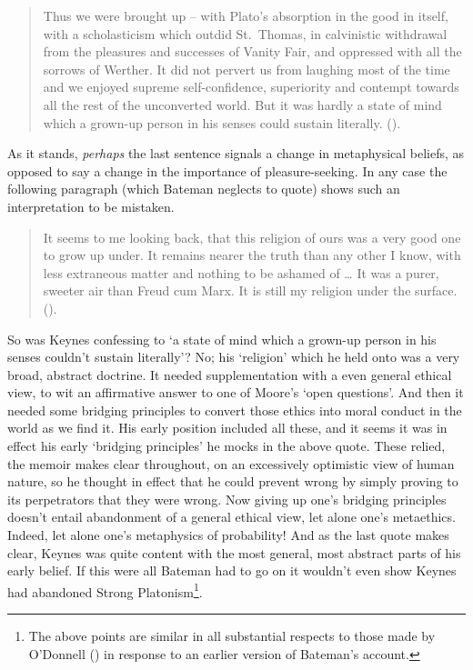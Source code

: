 \documentclass[
  10pt,
  letterpaper,
  DIV=11,
  numbers=noendperiod,
  twoside]{scrartcl}
\begin{document}
\begin{quote}
Thus we were brought up -- with Plato's absorption in the good in
itself, with a scholasticism which outdid St.~Thomas, in calvinistic
withdrawal from the pleasures and successes of Vanity Fair, and
oppressed with all the sorrows of Werther. It did not pervert us from
laughing most of the time and we enjoyed supreme self-confidence,
superiority and contempt towards all the rest of the unconverted world.
But it was hardly a state of mind which a grown-up person in his senses
could sustain literally. ().
\end{quote}

As it stands, \emph{perhaps} the last sentence signals a change in
metaphysical beliefs, as opposed to say a change in the importance of
pleasure-seeking. In any case the following paragraph (which Bateman
neglects to quote) shows such an interpretation to be mistaken.

\begin{quote}
It seems to me looking back, that this religion of ours was a very good
one to grow up under. It remains nearer the truth than any other I know,
with less extraneous matter and nothing to be ashamed of \ldots{} It was
a purer, sweeter air than Freud cum Marx. It is still my religion under
the surface. ().
\end{quote}

So was Keynes confessing to `a state of mind which a grown-up person in
his senses couldn't sustain literally'? No; his `religion' which he held
onto was a very broad, abstract doctrine. It needed supplementation with
a even general ethical view, to wit an affirmative answer to one of
Moore's `open questions'. And then it needed some bridging principles to
convert those ethics into moral conduct in the world as we find it. His
early position included all these, and it seems it was in effect his
early `bridging principles' he mocks in the above quote. These relied,
the memoir makes clear throughout, on an excessively optimistic view of
human nature, so he thought in effect that he could prevent wrong by
simply proving to its perpetrators that they were wrong. Now giving up
one's bridging principles doesn't entail abandonment of a general
ethical view, let alone one's metaethics. Indeed, let alone one's
metaphysics of probability! And as the last quote makes clear, Keynes
was quite content with the most general, most abstract parts of his
early belief. If this were all Bateman had to go on it wouldn't even
show Keynes had abandoned Strong Platonism\footnote{The above points are
  similar in all substantial respects to those made by O'Donnell
  () in response to an earlier version
  of Bateman's account.}.
\end{document}
